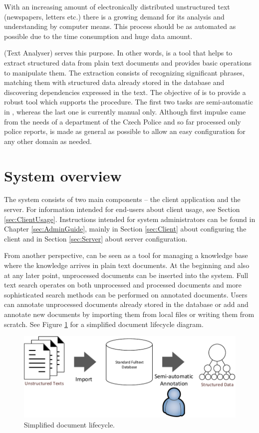 
With an increasing amount of electronically distributed unstructured text
(newspapers, letters etc.) there is a growing demand for its analysis and
understanding by computer means. This process should be as automated as possible
due to the time consumption and huge data amount.

\textan{} (Text Analyser) serves this purpose. In other words, \textan{} is a
tool that helps to extract structured data from plain text documents and provides
basic operations to manipulate them. The extraction consists of
recognizing significant phrases, matching them with structured data already stored in the
database and discovering dependencies expressed in the text.
The
objective of \textan{} is to provide a robust tool which supports the procedure.
The first two tasks
are semi-automatic in \textan{}, whereas the last one is currently manual only. 
Although first impulse came from the needs of a department of the Czech Police
and \textan{} so far processed only police reports, \textan{} is made as general as
possible to allow an easy configuration for any other domain as needed.

\section{System overview}
The system consists of two main components -- the client application
and the server. For information intended for end-users about client usage, see
Section \ref{sec:ClientUsage}. Instructions intended for system
administrators can be found in Chapter \ref{sec:AdminGuide}, mainly in Section
\ref{sec:Client} about configuring the client and in Section \ref{sec:Server}
about server configuration.

From another perspective, \textan{} can be seen as a tool for managing a
knowledge base where the knowledge arrives in plain text documents.
At the beginning and also at any later point, unprocessed documents
can be inserted into the system. Full text search operates on both
unprocessed and processed documents and more sophisticated search methods can be
performed on annotated documents. Users can annotate unprocessed documents
already stored
in the database or add and annotate new documents by importing them from local files or
writing them from scratch. See Figure \ref{fig:Overview} for a simplified document
lifecycle diagram.

\begin{figure}[!htb]
        \centering
        \includegraphics[width=\textwidth]{Images/Overview}
        \caption{Simplified document lifecycle.}
        \label{fig:Overview}
\end{figure}


